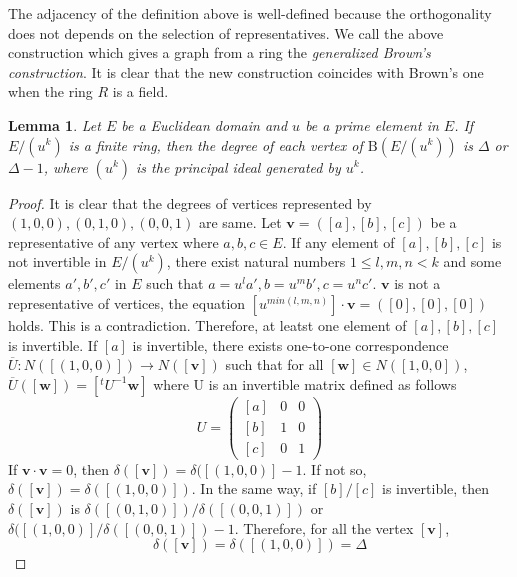 \documentclass{article}
\newtheorem{Lem}{Lemma}
\newtheorem{Cor}[Lem]{Corollary}
\newcommand{\B}{\mathrm{B}}
\begin{document}
The adjacency of the definition above is well-defined because the orthogonality does not depends on the selection of representatives. We call the above construction which gives a graph from a ring the {\it generalized Brown's construction}. It is clear that the new construction coincides with Brown's one when the ring $R$ is a field. 

\iffalse

\begin{Lem}
Let $R_1, R_2$ be commutative rings with unit. 
\[ \B(R_1 \times R_2) \simeq \B(R_1) \otimes \B(R_2) \]
\end{Lem}

\begin{Cor}
The followig equations hold.
\begin{enumerate}
\item $ | \B(R_1 \times R_2) | = | \B(R_1) | \times | \B(R_2) | $
\item $ \Delta(\B(R_1 \times R_2)) = \Delta(\B(R_1)) \times \Delta( \B(R_2) )$
\end{enumerate}
\end{Cor}

\fi 

\begin{Lem}\label{Lem:regular}
Let $E$ be a Euclidean domain and $u$ be a prime element in $E$. 
If $E/(u^k)$ is a finite ring, then the degree of each vertex of $\B(E/(u^k))$ is $\Delta$ or $\Delta-1$, 
where $(u^k)$ is the principal ideal generated by $u^k$. 
\end{Lem}

\begin{proof}
It is clear that the degrees of vertices represented by $(1,0,0), (0,1,0), (0,0,1)$ are same.
Let ${\bm v} = ([a],[b],[c])$ be a representative of any vertex where $a,b,c \in E$. 
If any element of $[a],[b],[c]$ is not invertible in $E/(u^k)$, 
there exist natural numbers $1 \leq l,m,n < k$ and some elements $a',b',c'$ in $E$ such that $a=u^l a', b=u^m b', c=u^n c'$. ${\bm v}$ is not a representative of vertices, the equation  $[u^{min(l,m,n)}] \cdot {\bm v} = ([0],[0],[0])$ holds. 
This is a contradiction.
Therefore, at leatst one element of $[a],[b],[c]$ is invertible.
If $[a]$ is invertible, there exists one-to-one correspondence $\overline{U}: N([(1,0,0)])  \rightarrow N([{\bm v}])$ such that for all $[{\bm w}] \in N([1,0,0])$, $\overline{U}([\bm w]) = [ {}^t\!U^{-1} {\bm w} ]$ where U is an invertible matrix defined as follows
\[
 U = \left(
 \begin{matrix}
  [a] & 0 & 0 \\
  [b] & 1 & 0 \\
  [c] & 0 & 1
 \end{matrix} \right)
\]
If ${\bm v} \cdot {\bm v} = 0$, then $\delta([\bm v]) = \delta([(1,0,0)] - 1$. If not so, $\delta([\bm v]) = \delta([(1,0,0)])$.
In the same way, if $[b]/[c]$ is invertible, then $\delta([\bm v])$ is $\delta([(0,1,0)])/\delta([(0,0,1)])$ or $\delta([(1,0,0)]/\delta([(0,0,1)]) - 1$.
Therefore, for all the vertex $[{\bm v}]$, 
\[ \delta([\bm v]) = \delta([(1,0,0)]) = \Delta \]

\end{proof}
\end{document}
